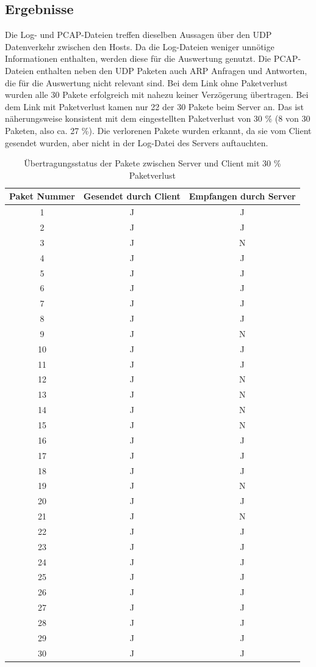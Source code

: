 \subsection{Ergebnisse}
Die Log- und PCAP-Dateien treffen dieselben Aussagen über den UDP Datenverkehr zwischen den Hosts.
Da die Log-Dateien weniger unnötige Informationen enthalten, werden diese für die Auswertung genutzt. Die PCAP-Dateien enthalten neben den UDP Paketen auch ARP Anfragen und Antworten, die für die Auswertung nicht relevant sind.
Bei dem Link ohne Paketverlust wurden alle 30 Pakete erfolgreich mit nahezu keiner Verzögerung übertragen.
Bei dem Link mit Paketverlust kamen nur 22 der 30 Pakete beim Server an.
Das ist näherungsweise konsistent mit dem eingestellten Paketverlust von 30 \% (8 von 30 Paketen, also ca. 27 \%).
Die verlorenen Pakete wurden erkannt, da sie vom Client gesendet wurden, aber nicht in der Log-Datei des Servers auftauchten.

\begin{table}[h]
\centering
\begin{tabular}{c|c|c}
\hline
\textbf{Paket Nummer} & \textbf{Gesendet durch Client} & \textbf{Empfangen durch Server} \\
\hline
1 & J & J \\
2 & J & J \\
3 & J & N \\
4 & J & J  \\
5 & J & J \\
6 & J & J \\
7 & J & J \\
8 & J & J \\
9 & J & N \\
10 & J & J \\
11 & J & J \\
12 & J & N \\
13 & J & N \\
14 & J & N \\
15 & J & N \\
16 & J & J \\
17 & J & J \\
18 & J & J \\
19 & J & N \\
20 & J & J \\
21 & J & N \\
22 & J & J \\
23 & J & J \\
24 & J & J \\
25 & J & J \\
26 & J & J \\
27 & J & J \\
28 & J & J \\
29 & J & J \\
30 & J & J \\
\hline
\end{tabular}
\caption{Übertragungsstatus der Pakete zwischen Server und Client mit 30 \% Paketverlust}
\label{tab:package_transmission}
\end{table}

